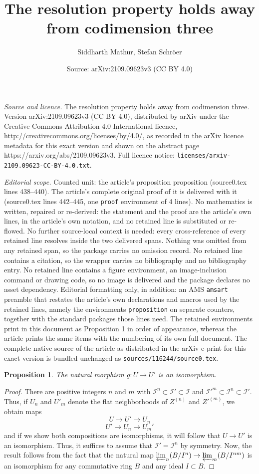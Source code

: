 \documentclass[10pt,a4paper]{amsart}
\title{The resolution property holds away from codimension three}
\author{Siddharth Mathur, Stefan Schr\"oer}
\date{Source: arXiv:2109.09623v3 (CC BY 4.0)}
\newtheorem{proposition}{Proposition}
\def\invlim{\varprojlim}
\renewcommand{\mathcal}{\mathscr}
\newcommand{\sh}[1]{\mathcal #1}
\begin{document}
\maketitle

\noindent\emph{Source and licence.} The resolution property holds away from codimension three. Version arXiv:2109.09623v3 (CC BY 4.0), distributed by arXiv under the Creative Commons Attribution 4.0 International licence, http://creativecommons.org/licenses/by/4.0/, as recorded in the arXiv licence metadata for this exact version and shown on the abstract page https://arxiv.org/abs/2109.09623v3. Full licence notice: \texttt{licenses/arxiv-2109.09623-CC-BY-4.0.txt}.\par\smallskip

\noindent\textit{Editorial scope.} Counted unit: the article's proposition proposition (source0.tex lines 438--440). The article's complete original proof of it is delivered with it (source0.tex lines 442--445, one \texttt{proof} environment of 4 lines). No mathematics is written, repaired or re-derived: the statement and the proof are the article's own lines, in the article's own notation, and no retained line is substituted or re-flowed.  No further source-local context is needed: every cross-reference of every retained line resolves inside the two delivered spans.  Nothing was omitted from any retained span, so the package carries no omission record.  No retained line contains a citation, so the wrapper carries no bibliography and no bibliography entry.  No retained line contains a figure environment, an image-inclusion command or drawing code, so no image is delivered and the package declares no asset dependency.  Editorial formatting only, in addition: an AMS \texttt{amsart} preamble that restates the article's own declarations and macros used by the retained lines, namely the environments \texttt{proposition} on separate counters, together with the standard packages those lines need.  The retained environments print in this document as Proposition 1 in order of appearance, whereas the article prints the same items with the numbering of its own full document.  The complete native source of the article as distributed in the arXiv e-print for this exact version is bundled unchanged as \texttt{sources/116244/source0.tex}.
\begin{proposition}
The natural morphism $g: U \to U'$ is an isomorphism. 
\end{proposition}

\begin{proof} There are positive integers $n$ and $m$ with $\sh{I}^n \subset \sh{I'} \subset \sh{I}$ and $\sh{I'}^m \subset \sh{I}^n \subset \sh{I}'$. Thus, if $U_n$ and $U'_m$ denote the flat neighborhoods of $Z^{(n)}$ and $Z'^{(m)}$, we obtain maps
\[U \to U' \to U_n\]
\[U' \to U_n \to U_m'\]
and if we show both compositions are isomorphisms, it will follow that $U \to U'$ is an isomorphism. Thus, it suffices to assume that $\sh{I}'=\sh{I}^n$ by symmetry. Now, the result follows from the fact that the natural map $\invlim_n (B/I^{n}) \to \invlim_m (B/I^{nm})$ is an isomorphism for any commutative ring $B$ and any ideal $I \subset B$.\end{proof}
\end{document}
